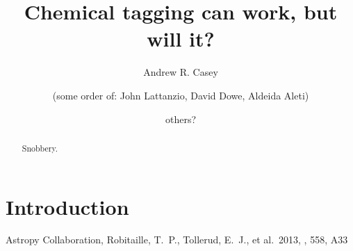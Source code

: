 \documentclass{aastex61}
\begin{document}
\title{Chemical tagging can work, but will it?}



\author[0000-0003-0174-0564]{Andrew R. Casey}

\author{(some order of: John Lattanzio, David Dowe, Aldeida Aleti)}

\author{others?}
 
\begin{abstract}
Snobbery.
\end{abstract}

\keywords{}

\section{Introduction} 
\label{sec:introduction}



\acknowledgments



\begin{thebibliography}{}

 Astropy Collaboration, Robitaille, T.~P., Tollerud, E.~J., et al.\ 2013, \aap, 558, A33 

\end{thebibliography}
\end{document}
